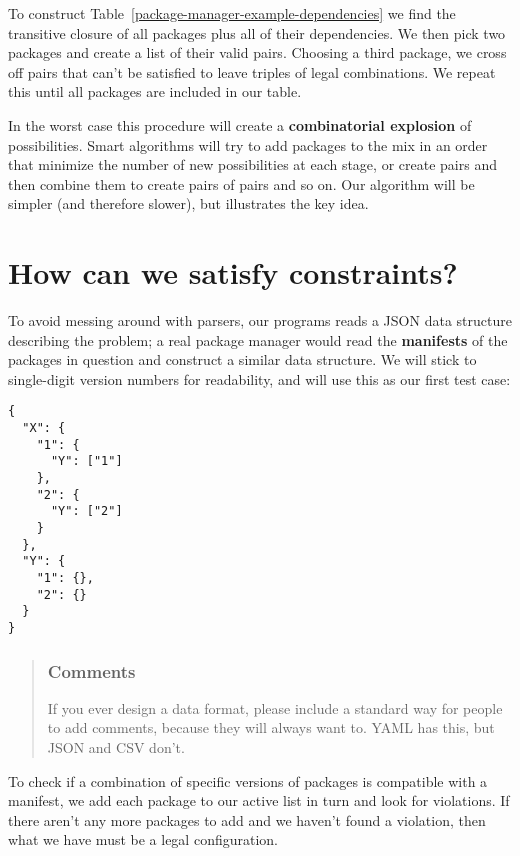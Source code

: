 \documentclass[krantzl]{krantz}
\newcommand{\tblref}[1]{Table~\ref{#1}}
\newcommand{\glossref}[1]{\textbf{#1}}
\newenvironment{callout}{\savenotes\begin{tBox}\begin{quotation}\toggletrue{inbox}\renewcommand{\thempfootnote}{\arabic{footnote}}}{\end{quotation}\vspace{\baselineskip}\end{tBox}\togglefalse{inbox}\spewnotes}
\begin{document}
To construct \tblref{package-manager-example-dependencies}
we find the transitive closure of all packages plus all of their dependencies.
We then pick two packages and create a list of their valid pairs.
Choosing a third package,
we cross off pairs that can't be satisfied
to leave triples of legal combinations.
We repeat this until all packages are included in our table.


In the worst case this procedure will create
a \glossref{combinatorial explosion} of possibilities.
Smart algorithms will try to add packages to the mix
in an order that minimize the number of new possibilities at each stage,
or create pairs and then combine them to create pairs of pairs and so on.
Our algorithm will be simpler (and therefore slower),
but illustrates the key idea.

\section{How can we satisfy constraints?}\label{package-manager-constraints}


To avoid messing around with parsers,
our programs reads a JSON data structure describing the problem;
a real package manager would read the \glossref{manifests} of the packages in question
and construct a similar data structure.
We will stick to single-digit version numbers for readability,
and will use this as our first test case:


\begin{lstlisting}[frame=single,frameround=tttt]
{
  "X": {
    "1": {
      "Y": ["1"]
    },
    "2": {
      "Y": ["2"]
    }
  },
  "Y": {
    "1": {},
    "2": {}
  }
}
\end{lstlisting}


\begin{callout}


\subsubsection*{Comments}


If you ever design a data format,
please include a standard way for people to add comments,
because they will always want to.
YAML has this,
but JSON and CSV don't.

\end{callout}


To check if a combination of specific versions of packages is compatible with a manifest,
we add each package to our active list in turn and look for violations.
If there aren't any more packages to add and we haven't found a violation,
then what we have must be a legal configuration.
\end{document}
